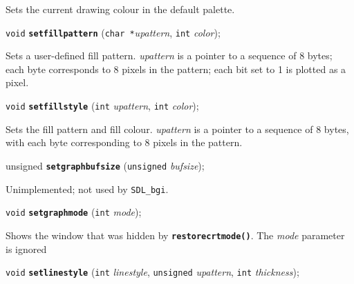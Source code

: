 \documentclass[a4paper,12pt]{article}
\newcommand{\SDLbgi}{\texttt{SDL\_bgi}}
\newcommand{\V}{\texttt{void}}      %
\newcommand{\I}{\texttt{int}}       %
\newcommand{\C}{\texttt{char *}}    %
\newcommand{\func}[1]{\textbf{\texttt{#1}}}  %
\newcommand{\A}[1]{\emph{#1}}       %
\newenvironment{bgi}
{ %
  \begin{snugshade}
}
{ %
  \end{snugshade}
}
\begin{document}
Sets the current drawing colour in the default palette.


\label{sec:setfillpattern}

\begin{bgi}
\V{} \func{setfillpattern} (\C{}\A{upattern}, \I{} \A{color});
\end{bgi}

Sets a user-defined fill pattern. \A{upattern} is a pointer to a
sequence of 8 bytes; each byte corresponds to 8 pixels in the pattern;
each bit set to 1 is plotted as a pixel.


\label{sec:setfillstyle}

\begin{bgi}
\V{} \func{setfillstyle} (\I{} \A{upattern}, \I{} \A{color});
\end{bgi}

Sets the fill pattern and fill colour. \A{upattern} is a pointer to a
sequence of 8 bytes, with each byte corresponding to 8 pixels in the
pattern.


\label{sec:setgraphbufsize}

\begin{bgi}
unsigned \func{setgraphbufsize} (\texttt{unsigned} \A{bufsize});
\end{bgi}

Unimplemented; not used by \SDLbgi.


\label{sec:setgraphmode}

\begin{bgi}
\V{} \func{setgraphmode} (\I{} \A{mode});
\end{bgi}

Shows the window that was hidden by \func{restorecrtmode()}. The
\A{mode} parameter is ignored


\label{sec:setlinestyle}

\begin{bgi}
\V{} \func{setlinestyle} (\I{} \A{linestyle}, \texttt{unsigned}
\A{upattern}, \I{} \A{thickness});
\end{bgi}
\end{document}
